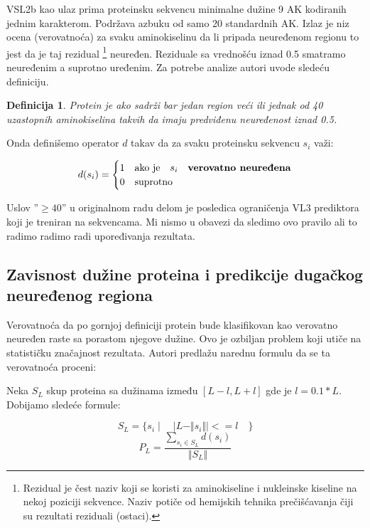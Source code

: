 VSL2b kao ulaz prima proteinsku sekvencu minimalne dužine 9 AK kodiranih jednim
karakterom. Podržava azbuku od samo 20 standardnih AK.  Izlaz je niz
ocena (verovatnoća) za svaku aminokiselinu da li pripada neuređenom regionu to
jest da je taj rezidual
\footnote{ Rezidual je čest naziv koji se koristi za aminokiseline i nukleinske
  kiseline na nekoj poziciji sekvence.  Naziv potiče od hemijskih tehnika
  prečišćavanja čiji su rezultati reziduali (ostaci).
} neuređen. Reziduale sa vrednošću iznad 0.5 smatramo neuređenim a suprotno
uređenim. Za potrebe analize autori \parencite{Xie2007} uvode sledeću definiciju.

\newtheorem{mydef}{Definicija}
\begin{mydef}
\label{pdis_def}
Protein je  
ako sadrži bar jedan region veći ili jednak od 40 uzastopnih aminokiselina
takvih da imaju \textit{predviđenu neuređenost} iznad 0.5. 
\end{mydef}

Onda definišemo operator $d$ takav da za svaku proteinsku sekvencu $s_i$ važi:


\[   
  d(s_i) = 
    \begin{cases}
      1 & \text{ako je} \quad s_i \quad \textbf{verovatno neuređena}\\
      0 & \text{suprotno}
    \end{cases}
\]

Uslov ''$\ge40$'' u originalnom radu delom je posledica ograničenja VL3
prediktora koji je treniran na  sekvencama. Mi nismo u obavezi
da sledimo ovo pravilo ali to radimo radimo radi upoređivanja rezultata.


\subsection{Zavisnost dužine proteina i predikcije dugačkog neuređenog regiona}

Verovatnoća da po gornjoj definiciji protein bude klasifikovan kao verovatno
neuređen raste sa porastom njegove dužine. Ovo je ozbiljan problem koji utiče
na statističku značajnost rezultata. Autori \parencite{Xie2007} 
predlažu narednu formulu da se ta verovatnoća proceni:

Neka $S_L$ skup proteina sa dužinama između $[L-l, L+l]$ gde je $l
= 0.1*L$. Dobijamo sledeće formule:

$$ S_L = \{s_i \mid \quad | L -  \Vert s_i \Vert | <= l \quad   \}$$
$$ P_L = \dfrac{ \sum_{s_i \in S_L} d(s_i)} {\Vert S_L \Vert}$$

